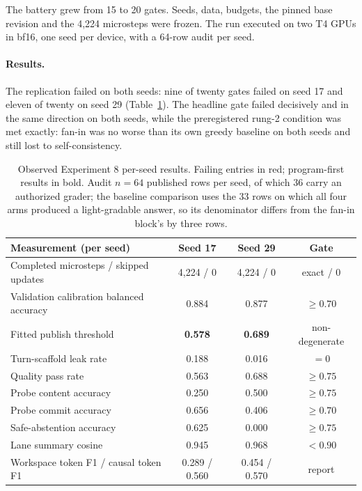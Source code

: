 \documentclass[10pt,a4paper]{article}
\newcommand{\fail}[1]{\textcolor{failred}{#1}}
\newcommand{\good}[1]{\textcolor{okgreen}{#1}}
\begin{document}
The battery grew from 15 to 20 gates. Seeds, data, budgets, the pinned base
revision and the 4{,}224 microsteps were frozen. The run executed on two T4
GPUs in bf16, one seed per device, with a 64-row audit per seed.

\paragraph{Results.}
The replication failed on both seeds: nine of twenty gates failed on seed 17
and eleven of twenty on seed 29 (Table~\ref{tab:study8}). The headline gate
failed decisively and in the same direction on both seeds, while the
preregistered rung-2 condition was met exactly: fan-in was no worse than its
own greedy baseline on both seeds and still lost to self-consistency.

\begin{table}[htbp]
\caption{Observed Experiment 8 per-seed results. Failing entries in red;
program-first results in bold. Audit $n=64$ published rows per seed, of which
36 carry an authorized grader; the baseline comparison uses the 33 rows on
which all four arms produced a light-gradable answer, so its denominator
differs from the fan-in block's by three rows.}
\label{tab:study8}
\centering\small
\begin{tabularx}{\textwidth}{@{}Xccc@{}}
\toprule
\textbf{Measurement (per seed)} & \textbf{Seed 17} & \textbf{Seed 29} & \textbf{Gate} \\
\midrule
Completed microsteps / skipped updates & 4{,}224 / 0 & 4{,}224 / 0 & exact / 0 \\
Validation calibration balanced accuracy & 0.884 & 0.877 & $\ge 0.70$ \\
Fitted publish threshold & \textbf{\good{0.578}} & \textbf{\good{0.689}} & non-degenerate \\
Turn-scaffold leak rate & \fail{0.188} & \fail{0.016} & $= 0$ \\
Quality pass rate & \fail{0.563} & \fail{0.688} & $\ge 0.75$ \\
Probe content accuracy & \fail{0.250} & \fail{0.500} & $\ge 0.75$ \\
Probe commit accuracy & \fail{0.656} & \fail{0.406} & $\ge 0.70$ \\
Safe-abstention accuracy & \fail{0.625} & \fail{0.000} & $\ge 0.75$ \\
Lane summary cosine & \fail{0.945} & \fail{0.968} & $< 0.90$ \\
Workspace token F1 / causal token F1 & 0.289 / 0.560 & 0.454 / 0.570 & report \\

\end{tabularx}
\end{table}
\end{document}
